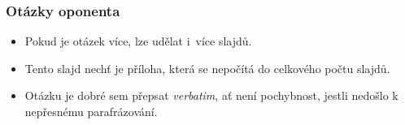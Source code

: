 \documentclass[english]{template/fitthesispresn.cls}
\begin{document}
    \appendix{}
    \begin{frame}
        \frametitle{Otázky oponenta}
        \begin{itemize}
            \item Pokud je otázek více, lze udělat i~více slajdů.
            \item Tento slajd nechť je příloha, která se nepočítá do celkového počtu slajdů.
            \item Otázku je dobré sem přepsat \emph{verbatim}, ať není pochybnost, jestli nedošlo k nepřesnému parafrázování.
        \end{itemize}
        \bigskip
    \end{frame}
\end{document}
